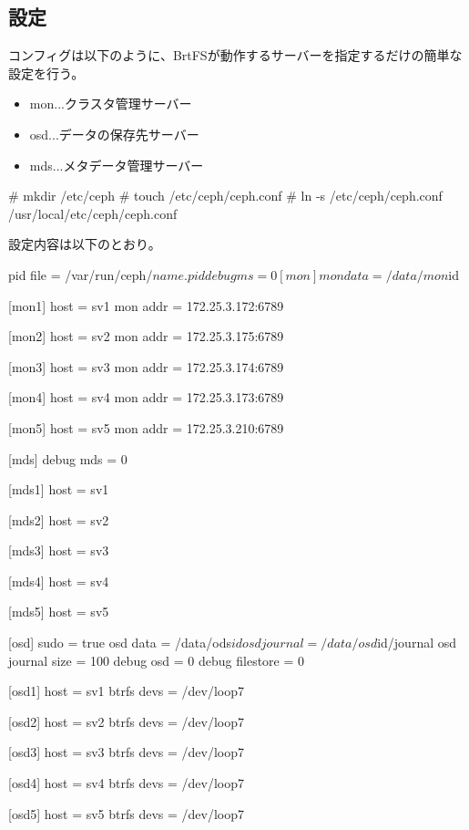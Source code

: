 \documentclass[mingoth,a4paper]{jsarticle}
\begin{document}
\subsection{設定}
コンフィグは以下のように、BrtFSが動作するサーバーを指定するだけの簡単な設定を行う。

\begin{itemize}
 \item mon...クラスタ管理サーバー
 \item osd...データの保存先サーバー
 \item mds...メタデータ管理サーバー
\end{itemize}

\begin{commandline}
# mkdir /etc/ceph
# touch /etc/ceph/ceph.conf
# ln -s /etc/ceph/ceph.conf /usr/local/etc/ceph/ceph.conf
\end{commandline}

設定内容は以下のとおり。
\begin{commandline}
[global]
        pid file = /var/run/ceph/$name.pid
        debug ms = 0

[mon]
        mon data = /data/mon$id

[mon1]
        host = sv1
        mon addr = 172.25.3.172:6789

[mon2]
        host = sv2
        mon addr = 172.25.3.175:6789

[mon3]
        host = sv3
        mon addr = 172.25.3.174:6789

[mon4]
        host = sv4
        mon addr = 172.25.3.173:6789

[mon5]
        host = sv5
        mon addr = 172.25.3.210:6789

[mds]
        debug mds = 0

[mds1]
        host = sv1

[mds2]
        host = sv2

[mds3]
        host = sv3

[mds4]
        host = sv4

[mds5]
        host = sv5

[osd]
        sudo = true
        osd data = /data/ods$id
        osd journal = /data/osd$id/journal
        osd journal size = 100
        debug osd  = 0
        debug filestore = 0

[osd1]
        host = sv1
        btrfs devs = /dev/loop7

[osd2]
        host = sv2
        btrfs devs = /dev/loop7

[osd3]
        host = sv3
        btrfs devs = /dev/loop7

[osd4]
        host = sv4
        btrfs devs = /dev/loop7

[osd5]
        host = sv5
        btrfs devs = /dev/loop7
\end{commandline}
\end{document}
